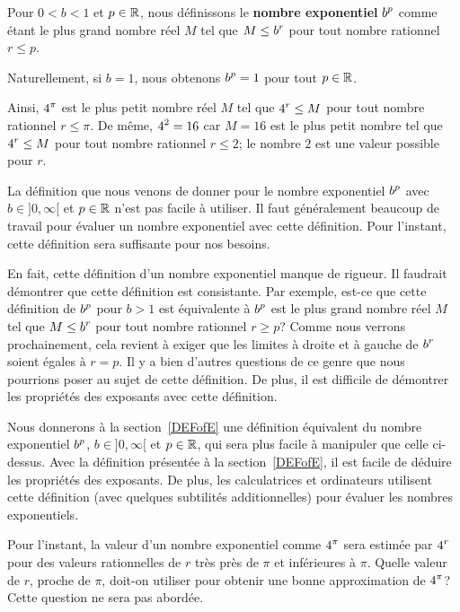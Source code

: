 {\begin{defn}
Pour $0<b<1$ et $p \in \mathbb{R}$, nous définissons le {\bfseries nombre exponentiel}
$\displaystyle b^p$ comme étant le plus grand nombre réel $M$ tel que $\displaystyle M \leq  b^r$
pour tout nombre rationnel $r\leq p$.

Naturellement, si $b=1$, nous obtenons $\displaystyle b^p = 1$ pour tout $p\in \mathbb{R}$.
\end{defn}


Ainsi, $\displaystyle 4^\pi$ est le plus petit nombre réel $M$ tel que $\displaystyle 4^r \leq M$
pour tout nombre rationnel $r\leq \pi$.  De même, $\displaystyle 4^2 = 16$ car
$M=16$ est le plus petit nombre tel que $\displaystyle 4^r \leq M$ pour tout nombre
rationnel $r\leq 2$; le nombre $2$ est une valeur possible pour $r$. 

La définition que nous venons de donner pour le nombre exponentiel
$\displaystyle b^p$ avec $b\in]0,\infty[$ et $p\in \mathbb{R}$ n'est pas facile à utiliser.
Il faut généralement beaucoup de travail pour évaluer un nombre
exponentiel avec cette définition.  Pour l'instant, cette définition
sera suffisante pour nos besoins.

En fait, cette définition d'un nombre exponentiel manque de rigueur.
Il faudrait démontrer que cette définition est consistante.  Par
exemple, est-ce que cette définition de $\displaystyle b^p$ pour $b>1$ est
équivalente à \lgm $\displaystyle b^p$ est le plus grand nombre réel $M$ tel que
$\displaystyle M \leq  b^r$ pour tout nombre rationnel $r\geq p$\rgm ?  Comme
nous verrons prochainement, cela revient à exiger que les limites à droite et à
gauche de $\displaystyle b^r$ soient égales à $r=p$.  Il y a bien d'autres questions
de ce genre que nous pourrions poser au sujet de cette définition.  
De plus, il est difficile de démontrer les propriétés des exposants
avec cette définition.

Nous donnerons à la section~\ref{DEFofE} une définition équivalent du
nombre exponentiel $\displaystyle b^p$, $b\in]0,\infty[$ et $p\in \mathbb{R}$, qui sera
plus facile à manipuler que celle ci-dessus.  Avec la définition
présentée à la section~\ref{DEFofE}, il est facile de déduire les
propriétés des exposants.  De plus, les calculatrices et ordinateurs
utilisent cette définition (avec quelques subtilités additionnelles)
pour évaluer les nombres exponentiels.

Pour l'instant, la valeur d'un nombre exponentiel comme $\displaystyle 4^\pi$
sera estimée
par $\displaystyle 4^r$ pour des valeurs rationnelles de $r$ très près de $\pi$ et
inférieures à $\pi$.  Quelle valeur de $r$, proche de $\pi$, doit-on
utiliser pour obtenir une bonne approximation de $\displaystyle 4^\pi$?  Cette
question ne sera pas abordée.

}
